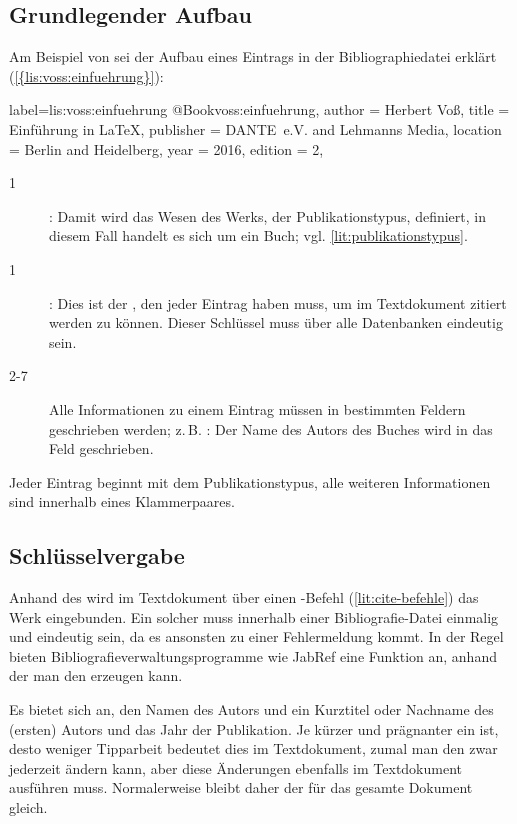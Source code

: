 \subsection{Grundlegender Aufbau}
Am Beispiel von \cite{voss:einfuehrung} sei der Aufbau eines Eintrags in der Bibliographiedatei erklärt (\cref{{lis:voss:einfuehrung}}):

\begin{lfgwcode}{label={lis:voss:einfuehrung}}
@Book{voss:einfuehrung,
 author    = {Herbert Voß}, 
 title     = {Einführung in \LaTeX},
 publisher = {DANTE~e.V. and Lehmanns Media},
 location  = {Berlin and Heidelberg},
 year      = {2016},
 edition   = {2},
}
\end{lfgwcode}

\begin{description}
 \item[1] : Damit wird das Wesen des Werks, der Publikationstypus, definiert, in diesem Fall handelt es sich um ein Buch; vgl. \cref{lit:publikationstypus}.
 \item[1] : Dies ist der , den jeder Eintrag haben muss, um im Textdokument zitiert werden zu können.
 Dieser Schlüssel muss über alle Datenbanken eindeutig sein.
 \item[2-7] Alle Informationen zu einem Eintrag müssen in bestimmten Feldern geschrieben werden; z.\,B. : 
 Der Name des Autors des Buches wird in das Feld  geschrieben. 
\end{description}
Jeder Eintrag beginnt mit dem Publikationstypus, alle weiteren Informationen sind innerhalb eines Klammerpaares.
\subsection{Schlüsselvergabe}
Anhand des  wird im Textdokument über einen -Befehl (\cref{lit:cite-befehle}) das Werk eingebunden.
Ein solcher  muss innerhalb einer Bibliografie-Datei einmalig und eindeutig sein, 
da es ansonsten zu einer Fehlermeldung kommt.
In der Regel bieten Bibliografieverwaltungsprogramme wie JabRef eine Funktion an, anhand der man den  erzeugen kann. 

Es bietet sich an, den Namen des Autors und ein Kurztitel oder Nachname des (ersten) Autors und das Jahr der Publikation. 
Je kürzer und prägnanter ein  ist, desto weniger Tipparbeit bedeutet dies im Textdokument, zumal man den  zwar jederzeit ändern kann, aber diese Änderungen ebenfalls im Textdokument ausführen muss. 
Normalerweise bleibt daher der  für das gesamte Dokument gleich.

